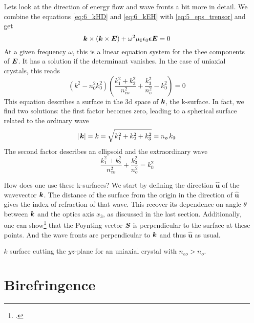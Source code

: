 Lets look at the direction of energy flow and wave fronts a bit more in detail. We combine the  equations  \ref{eq:6_kHD} and  \ref{eq:6_kEH} with \ref{eq:5_eps_trensor} and get
\begin{equation}
    \boldsymbol{k} \times ( \boldsymbol{k} \times \boldsymbol{E}) + \omega^2 \mu_0 \epsilon_0 \boldsymbol{\epsilon} \boldsymbol{E} = 0
\end{equation}
At a given frequency $\omega$, this is a linear equation system for the thee components of $\boldsymbol{E}$. It has a solution if the determinant vanishes. In the case of uniaxial crystals, this reads
\begin{equation}
    (k^2 - n_0^2 k_0^2) \left( \frac{k_1^2 + k_2^2}{n_{eo}^2} + \frac{k_3^2}{n_o^2} - k_0^2  \right) = 0
\end{equation}
This equation describes a surface in the 3d space of $\boldsymbol{k}$, the k-surface. In fact, we find two solutions: the first factor becomes zero, leading to a spherical surface related to  the ordinary wave 
\begin{equation}
    | \boldsymbol{k}| = k  = \sqrt{k_1^2 + k_2^2 + k_3^2} = n_o \, k_0
\end{equation}
The second factor describes an ellipsoid and the extraordinary wave
\begin{equation}
    \frac{k_1^2 + k_2^2}{n_{eo}^2} + \frac{k_3^2}{n_o^2} = k_0^2 
\end{equation}



How does one use these k-surfaces? We start by defining the direction $\boldsymbol{\hat{u}}$ of the wavevector $\boldsymbol{k}$. The distance of the surface from the origin in the direction of $\boldsymbol{\hat{u}}$ gives the index of refraction of that wave. This recover its dependence on angle $\theta$ between $\boldsymbol{k}$ and the optics axis $x_3$, as discussed in the last section. Additionally, one can show\footcite{SalehTeich1991} that the Poynting vector $\boldsymbol{S}$ is perpendicular to the surface at these points. And the wave fronts are perpendicular to $\boldsymbol{k}$ and thus $\boldsymbol{\hat{u}}$ as usual.

\begin{marginfigure}
    \caption{$k$ surface cutting the $yz$-plane for an uniaxial crystal with $n_{eo}  > n_o$.}
\end{marginfigure}

\section{Birefringence}

